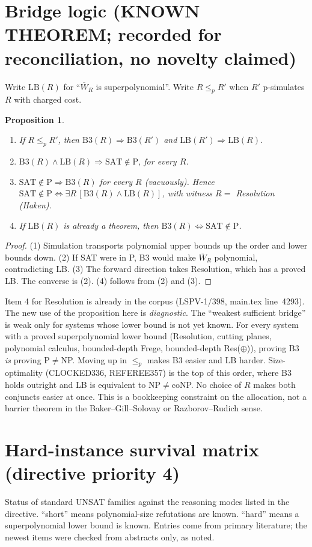 \documentclass[11pt]{article}
\newtheorem{proposition}{Proposition}
\begin{document}
\section{Bridge logic (KNOWN THEOREM; recorded for reconciliation, no novelty claimed)}
Write $\mathrm{LB}(R)$ for ``$\overline W_R$ is superpolynomial''. Write $R\le_p R'$ when $R'$ p-simulates $R$ with charged cost.
\begin{proposition}\label{prop:lattice}
\begin{enumerate}
\item If $R\le_p R'$, then $\mathrm{B3}(R)\Rightarrow\mathrm{B3}(R')$ and $\mathrm{LB}(R')\Rightarrow\mathrm{LB}(R)$.
\item $\mathrm{B3}(R)\wedge\mathrm{LB}(R)\Rightarrow\mathrm{SAT}\notin\mathrm P$, for every $R$.
\item $\mathrm{SAT}\notin\mathrm P\Rightarrow\mathrm{B3}(R)$ for every $R$ (vacuously). Hence $\mathrm{SAT}\notin\mathrm P\iff\exists R\,[\mathrm{B3}(R)\wedge\mathrm{LB}(R)]$, with witness $R=$ Resolution (Haken).
\item If $\mathrm{LB}(R)$ is already a theorem, then $\mathrm{B3}(R)\iff\mathrm{SAT}\notin\mathrm P$.
\end{enumerate}
\end{proposition}
\begin{proof}
(1) Simulation transports polynomial upper bounds up the order and lower bounds down. (2) If SAT were in P, B3 would make $\overline W_R$ polynomial, contradicting LB. (3) The forward direction takes Resolution, which has a proved LB. The converse is (2). (4) follows from (2) and (3).
\end{proof}
\noindent Item 4 for Resolution is already in the corpus (LSPV-1/398, main.tex line~4293). The new use of the proposition here is \emph{diagnostic}. The ``weakest sufficient bridge'' is weak only for systems whose lower bound is not yet known. For every system with a proved superpolynomial lower bound (Resolution, cutting planes, polynomial calculus, bounded-depth Frege, bounded-depth Res($\oplus$)), proving B3 \emph{is} proving P$\ne$NP. Moving up in $\le_p$ makes B3 easier and LB harder. Size-optimality (CLOCKED336, REFEREE357) is the top of this order, where B3 holds outright and LB is equivalent to NP$\ne$coNP. No choice of $R$ makes both conjuncts easier at once. This is a bookkeeping constraint on the allocation, not a barrier theorem in the Baker--Gill--Solovay or Razborov--Rudich sense.

\section{Hard-instance survival matrix (directive priority 4)}
Status of standard UNSAT families against the reasoning modes listed in the directive. ``short'' means polynomial-size refutations are known. ``hard'' means a superpolynomial lower bound is known. Entries come from primary literature; the newest items were checked from abstracts only, as noted.
\end{document}

